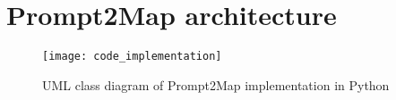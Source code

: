 
%


\chapter{Prompt2Map architecture}
\label{app:lorem_ipsum2}

\begin{figure}[htbp]
    \centering
    \texttt{[image: code\_implementation]}
    \caption{UML class diagram of Prompt2Map implementation in Python}
    \label{fig:Figures_Tree_silhouettes-vectorial}
  \end{figure}
  
